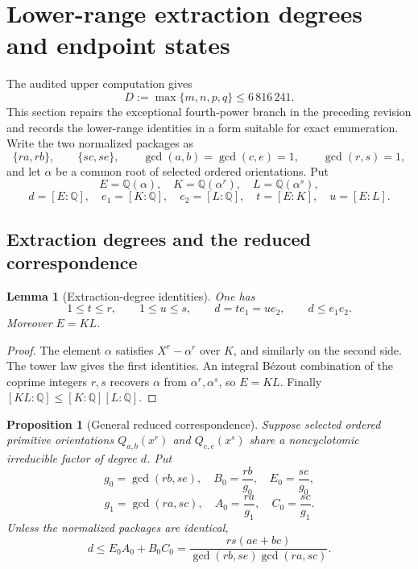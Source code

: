 \documentclass[11pt]{article}
\newtheorem{proposition}[theorem]{Proposition}
\newtheorem{lemma}[theorem]{Lemma}
\theoremstyle{definition}
\newcommand{\Q}{\mathbb Q}
\begin{document}
\section{Lower-range extraction degrees and endpoint states}
\label{sec:lowerstates}

The audited upper computation gives
\[
 D:=\max\{m,n,p,q\}\leq6\,816\,241.
\]
This section repairs the exceptional fourth-power branch in the preceding
revision and records the lower-range identities in a form suitable for exact
enumeration.  Write the two normalized packages as
\[
 \{ra,rb\},\qquad \{sc,se\},
 \qquad \gcd(a,b)=\gcd(c,e)=1,
 \qquad \gcd(r,s)=1,
\]
and let \(\alpha\) be a common root of selected ordered orientations.  Put
\[
 E=\Q(\alpha),\quad K=\Q(\alpha^r),\quad L=\Q(\alpha^s),
\]
\[
 d=[E:\Q],\quad e_1=[K:\Q],\quad e_2=[L:\Q],
 \quad t=[E:K],\quad u=[E:L].
\]

\subsection{Extraction degrees and the reduced correspondence}

\begin{lemma}[Extraction-degree identities]\label{lem:extractiondegrees}
One has
\begin{equation}
 1\leq t\leq r,\qquad 1\leq u\leq s,
 \qquad d=te_1=ue_2,
 \qquad d\leq e_1e_2.
 \tag{19.1}
\end{equation}
Moreover \(E=KL\).
\end{lemma}

\begin{proof}
The element \(\alpha\) satisfies \(X^r-\alpha^r\) over \(K\), and similarly
on the second side.  The tower law gives the first identities.  An integral
B\'ezout combination of the coprime integers \(r,s\) recovers \(\alpha\)
from \(\alpha^r,\alpha^s\), so \(E=KL\).  Finally
\([KL:\Q]\leq[K:\Q][L:\Q]\).
\end{proof}

\begin{proposition}[General reduced correspondence]
\label{prop:reducedcorrespondence}
Suppose selected ordered primitive orientations \(Q_{a,b}(x^r)\) and
\(Q_{c,e}(x^s)\) share a noncyclotomic irreducible factor of degree \(d\).
Put
\[
 g_0=\gcd(rb,se),\quad B_0=\frac{rb}{g_0},\quad E_0=\frac{se}{g_0},
\]
\[
 g_1=\gcd(ra,sc),\quad A_0=\frac{ra}{g_1},\quad C_0=\frac{sc}{g_1}.
\]
Unless the normalized packages are identical,
\begin{equation}
 \boxed{d\leq E_0A_0+B_0C_0
 =\frac{rs(ae+bc)}{\gcd(rb,se)\gcd(ra,sc)}.}
 \tag{19.2}
\end{equation}
\end{proposition}
\end{document}
